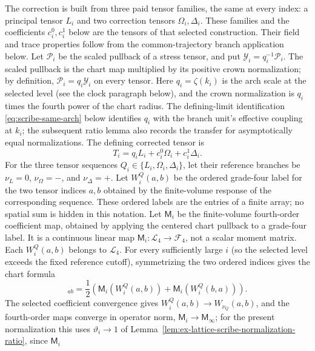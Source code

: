 The correction is built from three paid tensor families, the same at
every index: a principal tensor $L_i$ and two correction tensors
$\Omega_i,\Delta_i$. These families and the coefficients $c_i^0,c_i^1$
below are the tensors of that selected construction. Their field and
trace properties follow from the common-trajectory branch application below. Let
$\mathcal P_i$ be the scaled pullback of a stress tensor, and put
$\mathcal Y_i=q_i^{-1}\mathcal P_i$. The scaled pullback is the
chart map multiplied by its positive crown normalization; by definition,
$\mathcal P_i=q_i\mathcal Y_i$ on every tensor. Here
$q_i=\zeta(k_i)$ is the arch scale at the selected level (see the clock
paragraph below), and the crown normalization is $q_i$ times the fourth
power of the chart radius. The defining-limit identification
\eqref{eq:scribe-same-arch} below identifies $q_i$ with the branch
unit's effective coupling at $k_i$; the subsequent ratio lemma also
records the transfer for asymptotically equal normalizations. The defining corrected tensor is
\begin{equation}
 T_i=q_iL_i+c_i^0\Omega_i+c_i^1\Delta_i.
 \label{eq:ex-lattice-scribe-corrected-tensor}
\end{equation}
For the three tensor sequences $Q_i\in\{L_i,\Omega_i,\Delta_i\}$, let
their reference branches be $\nu_L=0$, $\nu_\Omega=-$, and
$\nu_\Delta=+$. Let $W_i^Q(a,b)$ be the ordered grade-four label for the
two tensor indices $a,b$ obtained by the finite-volume response of the
corresponding sequence. These ordered
labels are the entries of a finite array; no spatial sum is hidden in this
notation. Let $\mathsf M_i$ be the finite-volume fourth-order coefficient
map, obtained by applying the centered chart pullback to a grade-four label.
It is a continuous linear map
$\mathsf M_i:\mathcal L_4\to\mathcal F_4$, not a scalar moment matrix.
Each $W_i^Q(a,b)$ belongs to $\mathcal L_4$. For every sufficiently large
$i$ (so the selected level exceeds the fixed reference cutoff), symmetrizing
the two ordered indices gives the chart formula
\begin{equation}
 [\mathcal P_i(Q_i)]_{ab}=
 \frac12\left(\mathsf M_i(W_i^Q(a,b))+\mathsf M_i(W_i^Q(b,a))\right).
 \label{eq:ex-lattice-scribe-phase-formula}
\end{equation}
The selected coefficient convergence gives $W_i^Q(a,b)\to
W_{\nu_Q}(a,b)$, and the fourth-order maps converge in operator norm,
$\mathsf M_i\to\mathsf M_\infty$; for the present normalization this
uses $\vartheta_i\to1$ of
Lemma~\ref{lem:ex-lattice-scribe-normalization-ratio}, since $\mathsf M_i$
